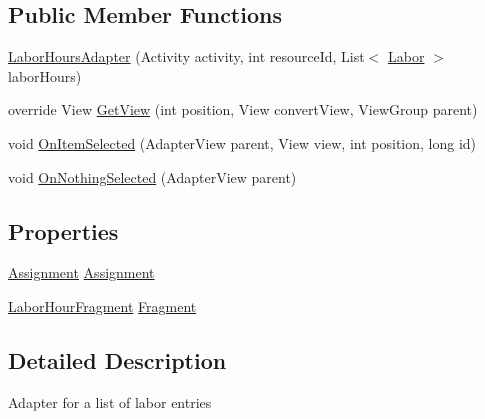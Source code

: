 \subsection*{Public Member Functions}
\begin{DoxyCompactItemize}
\item 
\hyperlink{class_field_service_1_1_android_1_1_labor_hours_adapter_aeac984ea0320ab9b522ddf2642e71ba8}{Labor\+Hours\+Adapter} (Activity activity, int resource\+Id, List$<$ \hyperlink{class_field_service_1_1_data_1_1_labor}{Labor} $>$ labor\+Hours)
\item 
override View \hyperlink{class_field_service_1_1_android_1_1_labor_hours_adapter_ab814ea2672b83b3de1d39310b7c4cd0a}{Get\+View} (int position, View convert\+View, View\+Group parent)
\item 
void \hyperlink{class_field_service_1_1_android_1_1_labor_hours_adapter_a33993fec5bf22252ff4fb56a812cd6e7}{On\+Item\+Selected} (Adapter\+View parent, View view, int position, long id)
\item 
void \hyperlink{class_field_service_1_1_android_1_1_labor_hours_adapter_a75e12c1f2a28a0a47404b10be38c4120}{On\+Nothing\+Selected} (Adapter\+View parent)
\end{DoxyCompactItemize}
\subsection*{Properties}
\begin{DoxyCompactItemize}
\item 
\hyperlink{class_field_service_1_1_data_1_1_assignment}{Assignment} \hyperlink{class_field_service_1_1_android_1_1_labor_hours_adapter_a943e4717a90006b9d56ae2b219c1ded3}{Assignment}
\item 
\hyperlink{class_field_service_1_1_android_1_1_fragments_1_1_labor_hour_fragment}{Labor\+Hour\+Fragment} \hyperlink{class_field_service_1_1_android_1_1_labor_hours_adapter_a0fb50dfdcce9895beb298878ed251baa}{Fragment}
\end{DoxyCompactItemize}


\subsection{Detailed Description}
Adapter for a list of labor entries 



